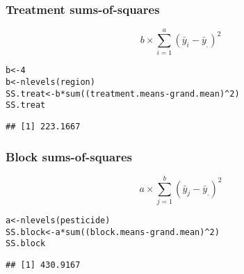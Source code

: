 \documentclass[color=usenames,dvipsnames]{beamer}\usepackage[]{graphicx}\usepackage[]{color}
\makeatletter
\newcommand{\hlnum}[1]{\textcolor[rgb]{0.69,0.494,0}{#1}}%
\newcommand{\hlopt}[1]{\textcolor[rgb]{0,0,0}{#1}}%
\newcommand{\hlstd}[1]{\textcolor[rgb]{0,0,0}{#1}}%
\newcommand{\hlkwb}[1]{\textcolor[rgb]{0,0.341,0.682}{#1}}%
\newcommand{\hlkwd}[1]{\textcolor[rgb]{0.004,0.004,0.506}{#1}}%
\newenvironment{kframe}{%
 \def\at@end@of@kframe{}%
 \ifinner\ifhmode%
  \def\at@end@of@kframe{\end{minipage}}%
  \begin{minipage}{\columnwidth}%
 \fi\fi%
 \def\FrameCommand##1{\hskip\@totalleftmargin \hskip-\fboxsep
 \colorbox{shadecolor}{##1}\hskip-\fboxsep
     \hskip-\linewidth \hskip-\@totalleftmargin \hskip\columnwidth}%
 \MakeFramed {\advance\hsize-\width
   \@totalleftmargin\z@ \linewidth\hsize
   \@setminipage}}%
 {\par\unskip\endMakeFramed%
 \at@end@of@kframe}
\newenvironment{knitrout}{}{} %
\makeatother
\begin{document}
\begin{frame}[fragile]
  \frametitle{Treatment sums-of-squares}
  {\Large
  \[
  b \times \sum_{i=1}^a (\bar{y}_i - \bar{y}_.)^2
  \]
  }
\begin{knitrout}
\color{fgcolor}\begin{kframe}
\begin{alltt}
\hlstd{b} \hlkwb{<-} \hlnum{4}
\hlstd{b} \hlkwb{<-} \hlkwd{nlevels}\hlstd{(region)}
\hlstd{SS.treat} \hlkwb{<-} \hlstd{b}\hlopt{*}\hlkwd{sum}\hlstd{((treatment.means} \hlopt{-} \hlstd{grand.mean)}\hlopt{^}\hlnum{2}\hlstd{)}
\hlstd{SS.treat}
\end{alltt}
\begin{verbatim}
## [1] 223.1667
\end{verbatim}
\end{kframe}
\end{knitrout}
\end{frame}



\begin{frame}[fragile]
  \frametitle{Block sums-of-squares}
  {\Large
  \[
  a \times \sum_{j=1}^b (\bar{y}_j - \bar{y}_.)^2
  \]
  }
\begin{knitrout}
\color{fgcolor}\begin{kframe}
\begin{alltt}
\hlstd{a} \hlkwb{<-} \hlkwd{nlevels}\hlstd{(pesticide)}
\hlstd{SS.block} \hlkwb{<-} \hlstd{a}\hlopt{*}\hlkwd{sum}\hlstd{((block.means} \hlopt{-} \hlstd{grand.mean)}\hlopt{^}\hlnum{2}\hlstd{)}
\hlstd{SS.block}
\end{alltt}
\begin{verbatim}
## [1] 430.9167
\end{verbatim}
\end{kframe}
\end{knitrout}
\end{frame}
\end{document}
